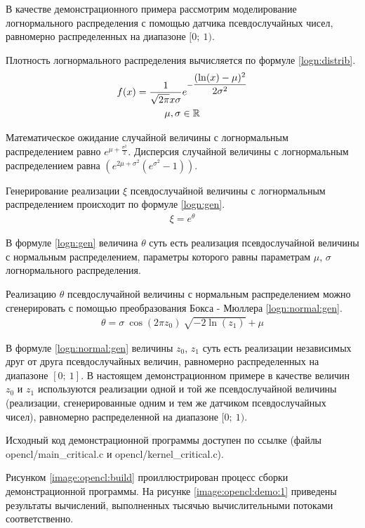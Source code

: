
В качестве демонстрационного примера рассмотрим моделирование логнормального распределения с помощью датчика псевдослучайных чисел, равномерно распределенных на диапазоне $[0 ;~ 1)$.

Плотность логнормального распределения вычисляется по формуле \eqref{logn:distrib}.
\begin{gather}
	f(x) = \frac{1}{\sqrt{2\pi}x\sigma}e^{-\dfrac{(\ln(x) - \mu)^2}{2\sigma^2}}\label{logn:distrib} \\
	\mu, \sigma \in \mathbb{R} \notag
\end{gather}

Математическое ожидание случайной величины с логнормальным распределением равно $e^{\mu + \frac{\sigma^2}{2}}$. Дисперсия случайной величины с логнормальным распределением равна $(e^{2\mu + \sigma^2}(e^{\sigma^2}- 1))$.

Генерирование реализации $\xi$ псевдослучайной величины с логнормальным распределением происходит по формуле \eqref{logn:gen}.
\begin{gather}
	\xi = e^\theta \label{logn:gen}
\end{gather}

В формуле \eqref{logn:gen} величина $\theta$ суть есть реализация псевдослучайной величины с нормальным распределением, параметры которого равны параметрам $\mu$, $\sigma$ логнормального распределения.

Реализацию $\theta$ псевдослучайной величины с нормальным распределением можно сгенерировать с помощью преобразования Бокса - Мюллера \eqref{logn:normal:gen}.
\begin{gather}
	\theta = \sigma ~ \cos(2 \pi z_0) ~ \sqrt{-2 \ln(z_1)} + \mu \label{logn:normal:gen}
\end{gather}

В формуле \eqref{logn:normal:gen} величины $z_0$, $z_1$ суть есть реализации независимых друг от друга псевдослучайных величин, равномерно распределенных на диапазоне $[0 ;~ 1]$. В настоящем демонстрационном примере в качестве величин $z_0$ и $z_1$ используются реализации одной и той же псевдослучайной величины (реализации, сгенерированные одним и тем же датчиком псевдослучайных чисел), равномерно распределенной на диапазоне $[0 ;~ 1)$.

Исходный код демонстрационной программы доступен по ссылке \cite{code} (файлы opencl/main\_critical.c и opencl/kernel\_critical.c).

Рисунком \ref{image:opencl:build} проиллюстрирован процесс сборки демонстрационной программы. На рисунке \ref{image:opencl:demo:1} приведены результаты вычислений, выполненных тысячью вычислительными потоками соответственно.


